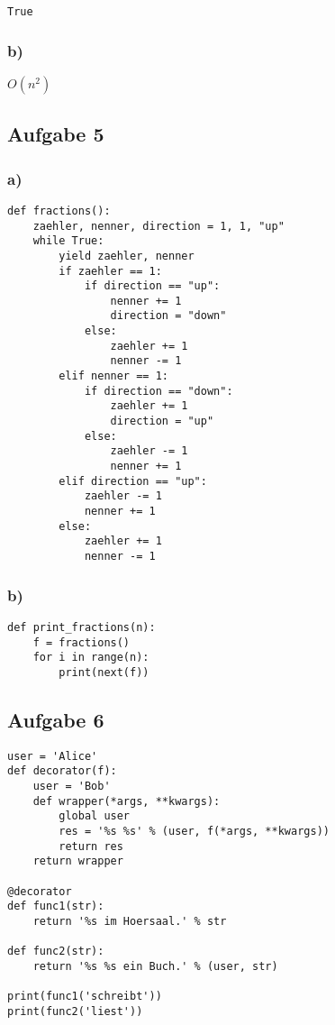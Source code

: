 \documentclass{scrartcl}
\begin{document}
\verb_True_

\subsubsection*{b)}
\(O(n^2)\)

\subsection*{Aufgabe 5}
\subsubsection*{a)}
\begin{lstlisting}
def fractions():
    zaehler, nenner, direction = 1, 1, "up"
    while True:
   		yield zaehler, nenner
        if zaehler == 1:
            if direction == "up":
                nenner += 1
                direction = "down"
            else:
                zaehler += 1
                nenner -= 1
        elif nenner == 1:
            if direction == "down":
                zaehler += 1
                direction = "up"
            else:
                zaehler -= 1
                nenner += 1
        elif direction == "up":
            zaehler -= 1
            nenner += 1
        else:
            zaehler += 1
            nenner -= 1
\end{lstlisting}

\subsubsection*{b)}

\begin{lstlisting}
def print_fractions(n):
    f = fractions()
    for i in range(n):
        print(next(f))
\end{lstlisting}

\subsection*{Aufgabe 6}

\begin{lstlisting}
user = 'Alice'
def decorator(f):
    user = 'Bob'
    def wrapper(*args, **kwargs):
        global user
        res = '%s %s' % (user, f(*args, **kwargs))
        return res
    return wrapper

@decorator
def func1(str):
    return '%s im Hoersaal.' % str

def func2(str):
    return '%s %s ein Buch.' % (user, str)

print(func1('schreibt'))
print(func2('liest'))
\end{lstlisting}    
\end{document}
